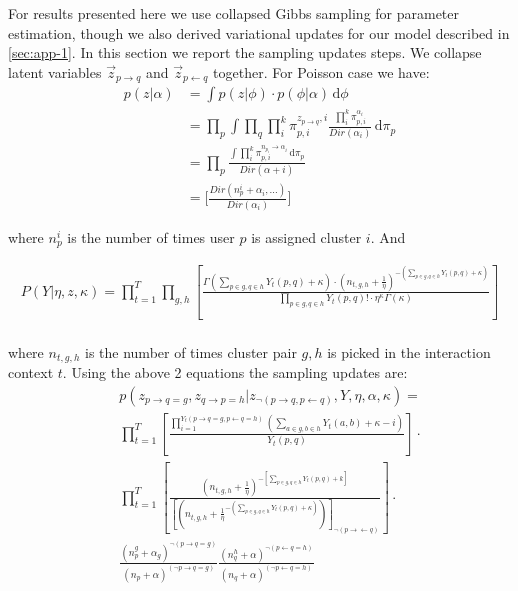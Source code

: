 For results presented here we use collapsed Gibbs sampling for parameter estimation, though 
we also derived variational updates for our model described in \ref{sec:app-1}.
In this section we report the sampling updates steps. We collapse latent variables 
$\overset{\rightarrow}{z}_{p \rightarrow q}$ and $\overset{\rightarrow}{z}_{p \leftarrow q}$ 
together. 
For Poisson case we have:
 \begin{eqnarray}
    p(z|\alpha) &= \int \! p(z|\phi) \cdot p(\phi|\alpha) \, \mathrm{d}\phi\\ \nonumber
    &= \prod_{p} \int \! {\prod_{q}{\prod_{i}^{k}{\pi_{p,i}^{z_{p \rightarrow q},i}}}  \frac{\prod_{i}^{k}{\pi_{p,i}^{\alpha_{i}}}}{Dir(\alpha_{i})} } \, \mathrm{d} \pi_{p}\\ \nonumber
    &= \prod_{p} \frac{\int \! {\prod_{i}^{k}{\pi_{p,i}^{n_{p_{i}} \rightarrow \alpha_{i}}}} \, \mathrm{d} \pi_{p}}{Dir(\alpha+{i})}\\ \nonumber
    &= \bigg[ \frac{Dir(n_{p}^{i} + \alpha_{i}, \dots)}{Dir(\alpha_{i})} \bigg]
  \end{eqnarray}

where $n_{p}^{i}$ is the number of times user $p$ is assigned cluster $i$. And 

\begin{eqnarray}
    P(Y|\eta, z, \kappa) = \prod_{t=1}^{T} \! \prod_{g,h} \left[ \frac{\Gamma(\sum_{p \in g, q \in h} Y_t(p,q) + \kappa) \cdot (n_{t,g,h} + \frac{1}{\eta})^{-(\sum_{p \in g, q \in h} Y_{t}(p,q) + \kappa)}}{\prod_{p \in g, q \in h} Y_t(p,q)! \cdot \eta^{\kappa} \Gamma(\kappa)} \right]\\ \nonumber
  \end{eqnarray}

where $n_{t,g,h}$ is the number of times cluster pair $g,h$ is picked in the interaction context $t$.
Using the above 2 equations the sampling updates are:
\begin{eqnarray}
    & &p(z_{p \rightarrow q = g}, z_{q \rightarrow p = h} | z_{\neg (p \rightarrow q, p \leftarrow q)}, Y, \eta, \alpha, \kappa)
    =\\ \nonumber & &\prod_{t=1}^{T} \left[  \frac{\prod_{i=1}^{Y_t(p \rightarrow q=g,p \leftarrow q=h)} \! (\sum_{a\in g, b \in h} Y_t(a,b) + \kappa - i)}{Y_t(p,q)} \right] \cdot\\ \nonumber
    & & \prod_{t=1}^{T}\left[\frac{(n_{t,g,h} + \frac{1}{\eta})^{-[\sum_{p \in g, q \in h} Y_{t} (p,q) + k]}}{\left[ \left(n_{t,g,h} + \frac{1}{\eta}^{-(\sum_{p \in g, q \in h} Y_{t}(p,q) + \kappa)} \right) \right]_{\neg (p \rightarrow \leftarrow q)}} \right]  \cdot \\ \nonumber
 & & \frac{(n_p^g + \alpha_g)^{\neg (p \rightarrow q = g)}}{(n_p + \alpha)^{(\neg p \rightarrow q =g)}} \frac{(n_q^h + \alpha)^{\neg (p \leftarrow q = h)}}{(n_q + \alpha)^{(\neg p \leftarrow q =h)}}
\end{eqnarray}

